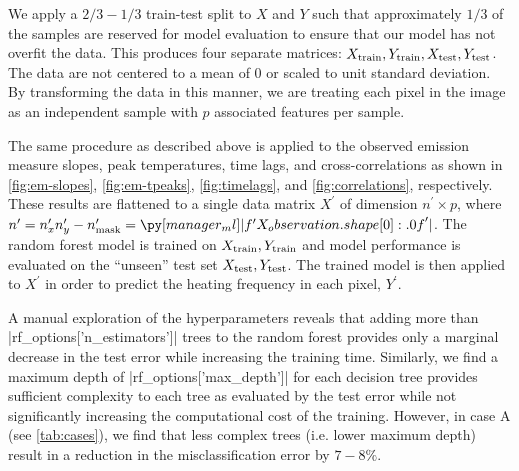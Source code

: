 We apply a $2/3-1/3$ train-test split to $X$ and $Y$ such that approximately $1/3$ of the samples are reserved for model evaluation to ensure that our model has not overfit the data.
This produces four separate matrices: $X_\textup{train},Y_\textup{train},X_\textup{test},Y_\textup{test}$.
The data are not centered to a mean of 0 or scaled to unit standard deviation.
By transforming the data in this manner, we are treating each pixel in the image as an independent sample with $p$ associated features per sample.

The same procedure as described above is applied to the observed emission measure slopes, peak temperatures, time lags, and cross-correlations as shown in \autoref{fig:em-slopes}, \autoref{fig:em-tpeaks}, \autoref{fig:timelags}, and \autoref{fig:correlations}, respectively.
These results are flattened to a single data matrix $X^\prime$ of dimension $n^\prime\times p$, where $n^\prime=n_x^\prime n_y^\prime - n^\prime_\textup{mask}=\py[manager_ml]|f'{X_observation.shape[0]:.0f}'|$.
The random forest model is trained on $X_\textup{train},Y_\textup{train}$ and model performance is evaluated on the ``unseen'' test set $X_\textup{test},Y_\textup{test}$.
The trained model is then applied to $X^\prime$ in order to predict the heating frequency in each pixel, $Y^\prime$.

A manual exploration of the hyperparameters reveals that adding more than \py[manager_ml]|rf_options['n_estimators']| trees to the random forest provides only a marginal decrease in the test error while increasing the training time.
Similarly, we find a maximum depth of \py[manager_ml]|rf_options['max_depth']| for each decision tree provides sufficient complexity to each tree as evaluated by the test error while not significantly increasing the computational cost of the training.
However, in case A (see \autoref{tab:cases}), we find that less complex trees (i.e. lower maximum depth) result in a reduction in the misclassification error by $7-8\%$.

